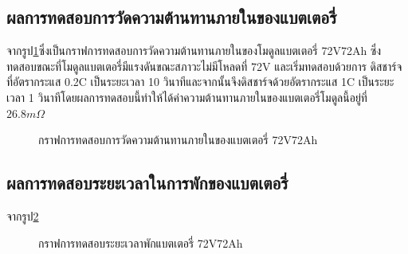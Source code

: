 \subsection{ผลการทดสอบการวัดความต้านทานภายในของแบตเตอรี่}
จากรูป\ref{fig:DCIR_Test}ซึ่งเป็นกราฟการทดสอบการวัดความต้านทานภายในของโมดูลแบตเตอรี่ 72V72Ah ซึ่งทดสอบขณะที่โมดูลแบตเตอรี่มีแรงดันขณะสภาวะไม่มีโหลดที่ 72V และเริ่มทดสอบด้วยการ
ดิสชาร์จที่อัตรากระแส 0.2C เป็นระยะเวลา 10 วินาทีและจากนั้นจึงดิสชาร์จด้วยอัตรากระแส 1C เป็นระยะเวลา 1 วินาทีโดยผลการทดสอบนี้ทำให้ได้ค่าความต้านทานภายในของแบตเตอรี่โมดูลนี้อยู่ที่ $26.8m\Omega$
\begin{center}
	\begin{figure}[H]
		\centering
		\captionsetup{justification=centering,margin=2cm}
		\caption{กราฟการทดสอบการวัดความต้านทานภายในของแบตเตอรี่ 72V72Ah}
		\label{fig:DCIR_Test}
	\end{figure}
\end{center}
\subsection{ผลการทดสอบระยะเวลาในการพักของแบตเตอรี่}
จากรูป\ref{fig:Rest_Test}
\begin{center}
	\begin{figure}[H]
		\centering
		\captionsetup{justification=centering,margin=2cm}
		\caption{กราฟการทดสอบระยะเวลาพักแบตเตอรี่ 72V72Ah}
		\label{fig:Rest_Test}
	\end{figure}
\end{center}
